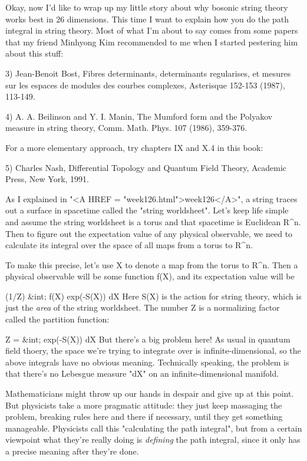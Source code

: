 Okay, now I'd like to wrap up my little story about why bosonic string
theory works best in 26 dimensions.  This time I want to explain how
you do the path integral in string theory.  Most of what I'm about to
say comes from some papers that my friend Minhyong Kim recommended 
to me when I started pestering him about this stuff:

3) Jean-Benoit Bost, Fibres determinants, determinants regularises, et
mesures sur les espaces de modules des courbes complexes, Asterisque
152-153 (1987), 113-149.

4) A. A. Beilinson and Y. I. Manin, The Mumford form and the Polyakov 
measure in string theory, Comm. Math. Phys. 107 (1986), 359-376.

For a more elementary approach, try chapters IX and X.4 in this book:

5) Charles Nash, Differential Topology and Quantum Field Theory, 
Academic Press, New York, 1991.


As I explained in "<A HREF = "week126.html">week126</A>", a
string traces out a surface in spacetime called the "string
worldsheet".  Let's keep life simple and assume the string
worldsheet is a torus and that spacetime is Euclidean R^{n}.
Then to figure out the expectation value of any physical observable, we
need to calculate its integral over the space of all maps from a torus
to R^{n}.


To make this precise, let's use X to denote a map from the torus to
R^{n}.  Then a physical observable will be some function f(X),
and its expectation value will be

                   (1/Z) &int; f(X) exp(-S(X)) dX
Here S(X) is the action for string theory, which is just the \emph{area} of 
the string worldsheet.  The number Z is a normalizing factor called the
partition function: 

                     Z = &int; exp(-S(X)) dX
But there's a big problem here!  As usual in quantum field thoery, the
space we're trying to integrate over is infinite-dimensional, so the
above integrals have no obvious meaning.  Technically speaking, the
problem is that there's no Lebesgue measure "dX" on an
infinite-dimensional manifold. 

Mathematicians might throw up our hands in despair and give up at this
point.  But physicists take a more pragmatic attitude: they just keep
massaging the problem, breaking rules here and there if necessary, until
they get something manageable.   Physicists call this "calculating the
path integral", but from a certain viewpoint what they're really doing
is \emph{defining} the path integral, since it only has a precise meaning
after they're done.  

